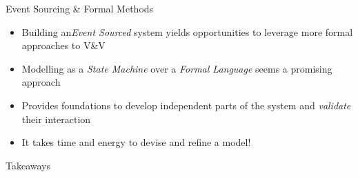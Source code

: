 \begin{frame}[fragile]{Event Sourcing \& Formal Methods}
  \begin{itemize}[<+->]
  \item Building an\emph{Event Sourced} system yields opportunities to leverage more formal approaches to V\&V
  \item Modelling as a \emph{State Machine} over a \emph{Formal Language} seems a promising approach
  \item Provides foundations to develop independent parts of the system and \emph{validate} their interaction
  \item It takes time and energy to devise and refine a model!
  \end{itemize}
\end{frame}

\begin{frame}[fragile]{Takeaways}
\end{frame}

